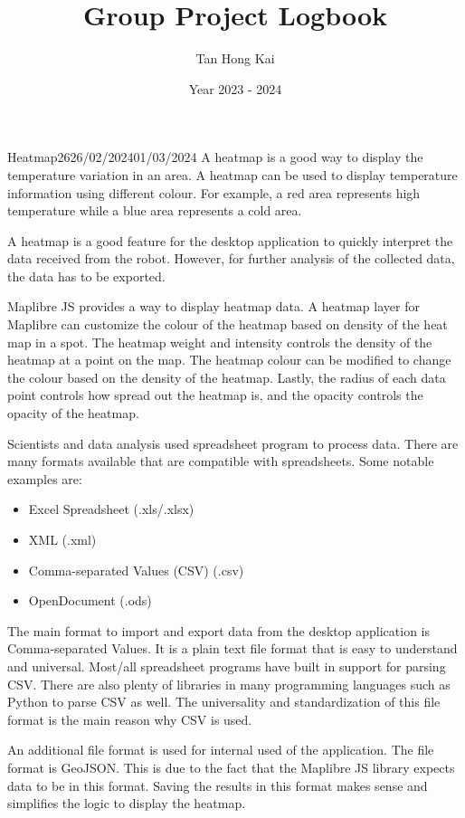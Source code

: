 \documentclass[12pt]{article}
\title{Group Project Logbook}
\author{Tan Hong Kai}
\date{Year 2023 - 2024}
\begin{document}
\maketitle

\begin{logbook-entry}{Heatmap}{26}{26/02/2024}{01/03/2024}
A heatmap is a good way to display the temperature variation in an area.
A heatmap can be used to display temperature information using different colour.
For example, a red area represents high temperature while a blue area represents a cold area.

A heatmap is a good feature for the desktop application to quickly interpret the data received from the robot.
However, for further analysis of the collected data, the data has to be exported.

Maplibre JS provides a way to display heatmap data.
A heatmap layer for Maplibre can customize the colour of the heatmap based on density of the heat map in a spot.
The heatmap weight and intensity controls the density of the heatmap at a point on the map.
The heatmap colour can be modified to change the colour based on the density of the heatmap.
Lastly, the radius of each data point controls how spread out the heatmap is, and the opacity controls the opacity of the heatmap.

Scientists and data analysis used spreadsheet program to process data.
There are many formats available that are compatible with spreadsheets.
Some notable examples are:

\begin{itemize}
    \item Excel Spreadsheet (.xls/.xlsx)
    \item XML (.xml)
    \item Comma-separated Values (CSV) (.csv)
    \item OpenDocument (.ods)
\end{itemize}

The main format to import and export data from the desktop application is Comma-separated Values.
It is a plain text file format that is easy to understand and universal.
Most/all spreadsheet programs have built in support for parsing CSV.
There are also plenty of libraries in many programming languages such as Python to parse CSV as well.
The universality and standardization of this file format is the main reason why CSV is used.

An additional file format is used for internal used of the application.
The file format is GeoJSON.
This is due to the fact that the Maplibre JS library expects data to be in this format.
Saving the results in this format makes sense and simplifies the logic to display the heatmap.


\end{logbook-entry}
\end{document}
